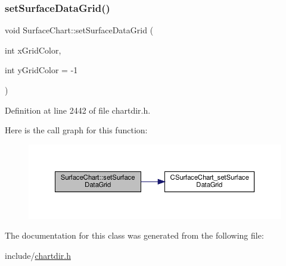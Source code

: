 \subsubsection{\texorpdfstring{set\+Surface\+Data\+Grid()}{setSurfaceDataGrid()}}
{\footnotesize\ttfamily void Surface\+Chart\+::set\+Surface\+Data\+Grid (\begin{DoxyParamCaption}\item[{int}]{x\+Grid\+Color,  }\item[{int}]{y\+Grid\+Color = {\ttfamily -\/1} }\end{DoxyParamCaption})\hspace{0.3cm}{\ttfamily [inline]}}



Definition at line 2442 of file chartdir.\+h.

Here is the call graph for this function\+:
\nopagebreak
\begin{figure}[H]
\begin{center}
\leavevmode
\includegraphics[width=350pt]{class_surface_chart_ad048fb7f9b93ec63ae529bba894cea39_cgraph}
\end{center}
\end{figure}


The documentation for this class was generated from the following file\+:\begin{DoxyCompactItemize}
\item 
include/\hyperlink{chartdir_8h}{chartdir.\+h}\end{DoxyCompactItemize}
